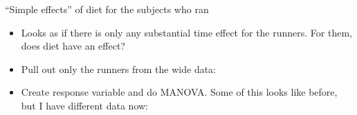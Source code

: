 \begin{frame}[fragile]{``Simple effects'' of diet for the subjects who ran}
  
  \begin{itemize}
  \item Looks as if there is only any substantial time effect for the
    runners. For them, does diet have an effect?
  \item Pull out only the runners from the wide data:
\begin{knitrout}
\color{fgcolor}\begin{kframe}
\begin{alltt}
\hlkwb{=}\hlopt{==}\hlstd{)}
\end{alltt}
\end{kframe}
\end{knitrout}
\item Create response variable and do MANOVA. Some of this looks like
  before, but I have different data now:
  
\begin{knitrout}
\color{fgcolor}\begin{kframe}
\begin{alltt}
\hlkwb{=}
\hlkwb{=}\hlopt{~}
\hlkwb{=}
\hlkwb{=}
\hlkwb{=}\hlopt{::}
                 \hlstd{=}\hlopt{~}
\end{alltt}
\end{kframe}
\end{knitrout}
  \end{itemize}
  
\end{frame}

